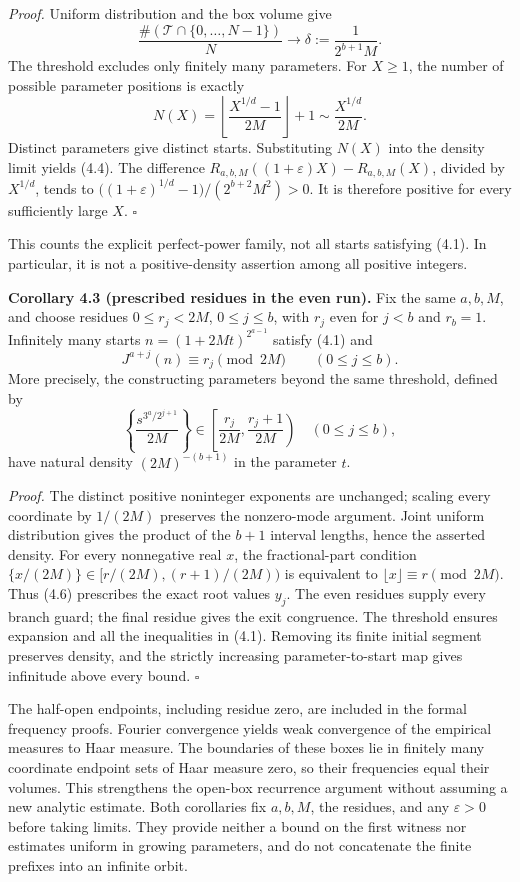 \documentclass[11pt,a4paper]{article}
\begin{document}
\emph{Proof.} Uniform distribution and the box volume give \[
\frac{\#(\mathcal T\cap\{0,\ldots,N-1\})}{N}
\longrightarrow\delta:=\frac1{2^{b+1}M}.
\] The threshold excludes only finitely many parameters. For \(X\ge1\),
the number of possible parameter positions is exactly \[
N(X)=\left\lfloor\frac{X^{1/d}-1}{2M}\right\rfloor+1
\sim\frac{X^{1/d}}{2M}.
\] Distinct parameters give distinct starts. Substituting \(N(X)\) into
the density limit yields (4.4). The difference
\(R_{a,b,M}((1+\varepsilon)X)-R_{a,b,M}(X)\), divided by \(X^{1/d}\),
tends to \(\bigl((1+\varepsilon)^{1/d}-1\bigr)/(2^{b+2}M^2)>0\). It is
therefore positive for every sufficiently large \(X\). \(\square\)

This counts the explicit perfect-power family, not all starts satisfying
(4.1). In particular, it is not a positive-density assertion among all
positive integers.

\textbf{Corollary 4.3 (prescribed residues in the even run).} Fix the
same \(a,b,M\), and choose residues \(0\le r_j<2M\), \(0\le j\le b\),
with \(r_j\) even for \(j<b\) and \(r_b=1\). Infinitely many starts
\(n=(1+2Mt)^{2^{a-1}}\) satisfy (4.1) and \[
J^{a+j}(n)\equiv r_j\pmod{2M}\qquad(0\le j\le b).
\tag{4.5}
\] More precisely, the constructing parameters beyond the same
threshold, defined by \[
\left\{\frac{s^{3^a/2^{j+1}}}{2M}\right\}
\in\left[\frac{r_j}{2M},\frac{r_j+1}{2M}\right)
\quad(0\le j\le b),
\tag{4.6}
\] have natural density \((2M)^{-(b+1)}\) in the parameter \(t\).

\emph{Proof.} The distinct positive noninteger exponents are unchanged;
scaling every coordinate by \(1/(2M)\) preserves the nonzero-mode
argument. Joint uniform distribution gives the product of the \(b+1\)
interval lengths, hence the asserted density. For every nonnegative real
\(x\), the fractional-part condition
\(\{x/(2M)\}\in[r/(2M),(r+1)/(2M))\) is equivalent to
\(\lfloor x\rfloor\equiv r\pmod{2M}\). Thus (4.6) prescribes the exact
root values \(y_j\). The even residues supply every branch guard; the
final residue gives the exit congruence. The threshold ensures expansion
and all the inequalities in (4.1). Removing its finite initial segment
preserves density, and the strictly increasing parameter-to-start map
gives infinitude above every bound. \(\square\)

The half-open endpoints, including residue zero, are included in the
formal frequency proofs. Fourier convergence yields weak convergence of
the empirical measures to Haar measure. The boundaries of these boxes
lie in finitely many coordinate endpoint sets of Haar measure zero, so
their frequencies equal their volumes. This strengthens the open-box
recurrence argument without assuming a new analytic estimate. Both
corollaries fix \(a,b,M\), the residues, and any \(\varepsilon>0\)
before taking limits. They provide neither a bound on the first witness
nor estimates uniform in growing parameters, and do not concatenate the
finite prefixes into an infinite orbit.
\end{document}
